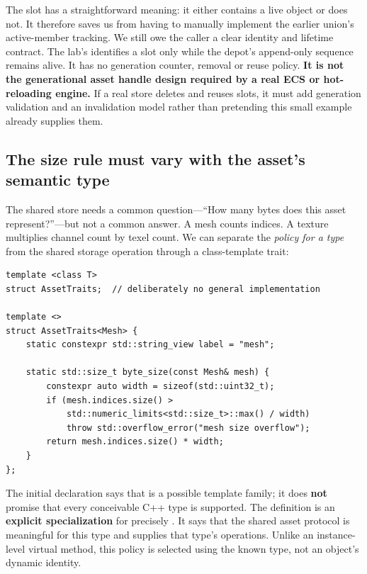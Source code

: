 The  slot has a straightforward meaning: it either contains a live  object or does not. It therefore saves us from having to manually implement the earlier union's active-member tracking. We still owe the caller a clear identity and lifetime contract. The lab's  identifies a slot only while the depot's append-only sequence remains alive. It has no generation counter, removal or reuse policy. \textbf{It is not the generational asset handle design required by a real ECS or hot-reloading engine.} If a real store deletes and reuses slots, it must add generation validation and an invalidation model rather than pretending this small example already supplies them.

\subsection{The size rule must vary with the asset's semantic type}\label{05-engine-i-ch005-the-size-rule-must-vary-with-the-assets-semantic-type}

\hypertarget{05-engine-i-ch005-the-size-rule-must-vary-with-the-assets-semantic-type}{}

The shared store needs a common question---``How many bytes does this asset represent?''---but not a common answer. A mesh counts indices. A texture multiplies channel count by texel count. We can separate the \emph{policy for a type} from the shared storage operation through a class-template trait:

\begin{verbatim}
template <class T>
struct AssetTraits;  // deliberately no general implementation

template <>
struct AssetTraits<Mesh> {
    static constexpr std::string_view label = "mesh";

    static std::size_t byte_size(const Mesh& mesh) {
        constexpr auto width = sizeof(std::uint32_t);
        if (mesh.indices.size() >
            std::numeric_limits<std::size_t>::max() / width)
            throw std::overflow_error("mesh size overflow");
        return mesh.indices.size() * width;
    }
};
\end{verbatim}

The initial declaration says that  is a possible template family; it does \textbf{not} promise that every conceivable C++ type is supported. The  definition is an \textbf{explicit specialization} for precisely . It says that the shared asset protocol is meaningful for this type and supplies that type's operations. Unlike an instance-level virtual method, this policy is selected using the known type, not an object's dynamic identity.

